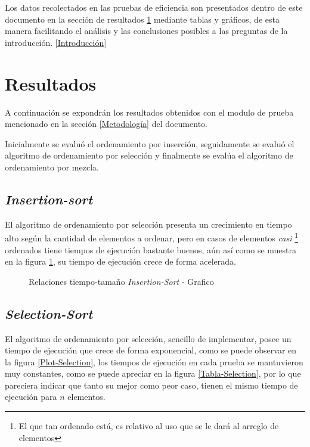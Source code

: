 \documentclass[twocolumn,english,journal]{IEEEtran}
\begin{document}
Los datos recolectados en las pruebas de eficiencia son presentados dentro de este documento en la sección de resultados \ref{Resultados} mediante tablas y gráficos, de esta manera facilitando el análisis y las conclusiones posibles a las preguntas de la introducción. \ref{Introducción}

\section{Resultados} \label{Resultados}
A continuación se expondrán los resultados obtenidos con el modulo de prueba mencionado en la sección \ref{Metodología} del documento.

Inicialmente se evaluó el ordenamiento por inserción, seguidamente se evaluó el algoritmo de ordenamiento por selección y finalmente se evalúa el algoritmo de ordenamiento por mezcla. 

\subsection{\emph{Insertion-sort}}
El algoritmo de ordenamiento por selección presenta un crecimiento en tiempo alto según la cantidad de elementos a ordenar, pero en casos de elementos \emph{casi} \footnote{El que tan ordenado está, es relativo al uso que se le dará al arreglo de elementos} ordenados tiene tiempos de ejecución bastante buenos, aún así como se muestra en la figura \ref{Plot-Insertion}, su tiempo de ejecución crece de forma acelerada.

\begin{figure}[h]
\caption{Relaciones tiempo-tamaño  \emph{Insertion-Sort} - Grafico  \label{Plot-Insertion}} 
\end{figure}



\subsection{\emph{Selection-Sort}}
El algoritmo de ordenamiento por selección, sencillo de implementar, posee un tiempo de ejecución que crece de forma exponencial, como se puede observar en la figura \ref{Plot-Selection}, los tiempos de ejecución en cada prueba se mantuvieron muy constantes, como se puede apreciar en la figura \ref{Tabla-Selection}, por lo que pareciera indicar que tanto su mejor como peor caso, tienen el mismo tiempo de ejecución para $n$ elementos.
\end{document}
